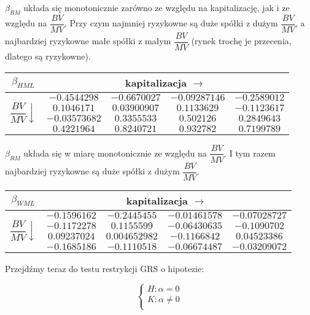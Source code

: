 \documentclass[11pt,a4paper]{report}
\begin{document}
$\beta_{RM}$ układa się monotonicznie zarówno ze względu na kapitalizację, jak i ze względu na $\dfrac{BV}{MV}$. Przy czym najmniej ryzykowne są duże spółki z dużym $\dfrac{BV}{MV}$, a najbardziej ryzykowne małe spółki z małym $\dfrac{BV}{MV}$ (rynek trochę je przecenia, dlatego są ryzykowne).

\begin{center}
\begin{tabular}{|c|c|c|c|c|}
\hline
$\beta_{HML}$ & \multicolumn{4}{|c|}{kapitalizacja $\longrightarrow$}  \\ \hline 
\multirow{4}{*}{$\dfrac{BV}{MV} \downarrow$} &  $ -0.4544298 $ & $ -0.6670027 $ & $ -0.09287146 $ & $ -0.2589012 $ \\ \cline{2-5}
 & $ 0.1046171 $ & $ 0.03900907 $ & $ 0.1133629 $ & $ -0.1123617 $ \\ \cline{2-5}
 & $ -0.03573682 $ & $ 0.3355533 $ & $ 0.502126 $ & $ 0.2849643 $ \\ \cline{2-5}
 & $ 0.4221964 $ & $ 0.8240721 $ & $ 0.932782 $ & $ 0.7199789 $ \\ \hline
\end{tabular}
\end{center}

$\beta_{RM}$ układa się w miarę monotonicznie ze względu na $\dfrac{BV}{MV}$. I tym razem najbardziej ryzykowne są duże spółki z dużym $\dfrac{BV}{MV}$.

\begin{center}
\begin{tabular}{|c|c|c|c|c|}
\hline
$\beta_{WML}$ & \multicolumn{4}{|c|}{kapitalizacja $\longrightarrow$}  \\ \hline 
\multirow{4}{*}{$\dfrac{BV}{MV} \downarrow$} &  $ -0.1596162 $ & $ -0.2445455 $ & $ -0.01461578 $ & $ -0.07028727 $ \\ \cline{2-5}
 & $ -0.1172278 $ & $ 0.1155599 $ & $ -0.06430635 $ & $ -0.1090702 $ \\ \cline{2-5}
 & $ 0.09237024 $ & $ 0.004652982 $ & $ -0.1166842 $ & $ 0.04523386 $ \\ \cline{2-5}
 & $ -0.1685186 $ & $ -0.1110518 $ & $ -0.06674487 $ & $ -0.03209072 $ \\ \hline
\end{tabular}
\end{center}

\bigskip

Przejdźmy teraz do testu restrykcji GRS o hipotezie:

$$
\left\{
\begin{array}{l}
H: \alpha = 0 \\
K: \alpha \neq 0\\
\end{array}
\right.
$$
\end{document}
